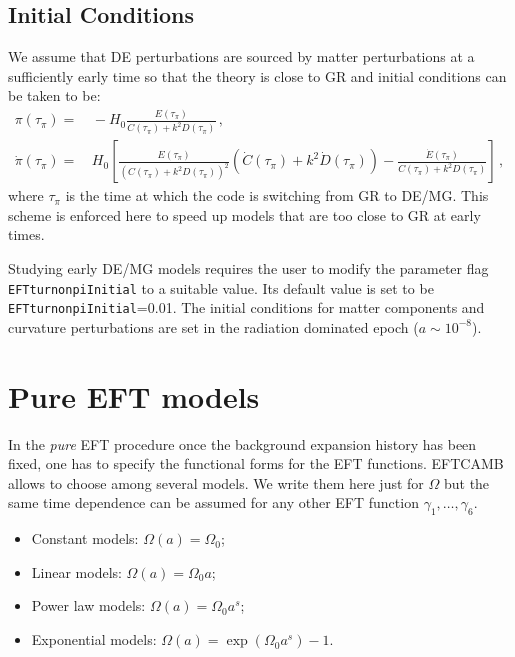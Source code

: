 \documentclass[prd,nofootinbib,showpacs]{revtex4}
\def\l{\left}
\def\r{\right}
\def\f{\frac}
\begin{document}
{%
\subsection{Initial Conditions}\label{SubSec:InitialConditions}
%
We assume that DE perturbations are sourced by matter perturbations at a sufficiently early time so that the theory is close to GR and initial conditions can be taken to be:
%
\begin{align}
\pi \l(\tau_\pi\r) =&\, -H_0 \f{E(\tau_\pi)}{C(\tau_\pi) +k^2 D(\tau_\pi)} \,,\nonumber \\
\dot{\pi} \l( \tau_\pi \r) =&\, H_0\l[\frac{E(\tau_\pi)}{(C(\tau_\pi)+k^2D(\tau_\pi))^2}(\dot{C}(\tau_\pi)+k^2\dot{D}(\tau_\pi))-\frac{\dot{E}(\tau_\pi)}{C(\tau_\pi)+k^2D(\tau_\pi)}\right] \,,
\end{align}
%
where $\tau_\pi$ is the time at which the code is switching from GR to DE/MG. This scheme is enforced here to speed up models that are too close to GR at early times. 


Studying early DE/MG models requires the user to modify the parameter flag \verb|EFTturnonpiInitial| to a suitable value. Its default value is set to be  \verb|EFTturnonpiInitial|=0.01. The  initial conditions for matter components and curvature perturbations are set in the radiation dominated epoch ($a \sim 10^{-8}$). 

\section{Pure EFT models}\label{Sec:PureEFTmodels}
%
In the \textit{pure} EFT procedure once the background expansion history has been fixed, one has to specify the functional forms for the EFT functions.  EFTCAMB allows to choose among several models. We write them here just for $\Omega$ but the same time dependence can be assumed for any other EFT function $\gamma_1,\dots,\gamma_6$.
%
\begin{itemize}
\item[] Constant models: $\Omega(a)=\Omega_0$; 
\item[] Linear models: $\Omega(a)=\Omega_0 a$;
\item[] Power law models: $\Omega(a)=\Omega_0 a^s$;
\item[] Exponential models: $\Omega(a)=  \exp{\left(\Omega_0 a^s\right)}-1$.
\end{itemize}
%

}
\end{document}
